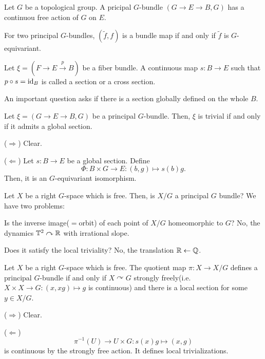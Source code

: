 \documentclass{../../../small}
\begin{document}
Let $G$ be a topological group.
A pricipal $G$-bundle $(G\to E\to B,G)$ has a continuou free action of $G$ on $E$.

\begin{rmk*}
For two principal $G$-bundles, $(\tilde f,f)$ is a bundle map if and only if $\tilde f$ is $G$-equivariant.
\end{rmk*}

\begin{defn}
Let $\xi=(F\to E\xrightarrow{p}B)$ be a fiber bundle.
A continuous map $s:B\to E$ such that $p\circ s=\operatorname{id}_B$ is called a section or a cross section.

An important question asks if there is a section globally defined on the whole $B$.
\end{defn}

\begin{prop}
Let $\xi=(G\to E\to B,G)$ be a principal $G$-bundle.
Then, $\xi$ is trivial if and only if it admits a global section.
\end{prop}

\begin{pf}
($\Rightarrow$)
Clear.

($\Leftarrow$)
Let $s:B\to E$ be a global section.
Define
\[\Phi:B\times G\to E:(b,g)\mapsto s(b)g.\]
Then, it is an $G$-equivariant isomorphism.
\end{pf}


Let $X$ be a right $G$-space which is free.
Then, is $X/G$ a principal $G$ bundle?
We have two problems:
\begin{parts}
\item Is the inverse image($=$orbit) of each point of $X/G$ homeomorphic to $G$?
No, the dynamics $\mathbb{T}^2\curvearrowright\mathbb{R}$ with irrational slope.
\item Does it satisfy the local triviality?
No, the translation $\mathbb{R}\leftarrow\mathbb{Q}$.
\end{parts}

\begin{prop}
Let $X$ be a right $G$-space which is free.
The quotient map $\pi:X\to X/G$ defines a principal $G$-bundle if and only if $X\curvearrowright G$ strongly freely(i.e. $X\times X\to G:(x,xg)\mapsto g$ is continuous) and there is a local section for some $y\in X/G$.
\end{prop}
\begin{pf}
($\Rightarrow$) Clear.

($\Leftarrow$)
\[\pi^{-1}(U)\to U\times G:s(x)g\mapsto(x,g)\]
is continuous by the strongly free action.
It defines local trivializations.
\end{pf}
\end{document}
